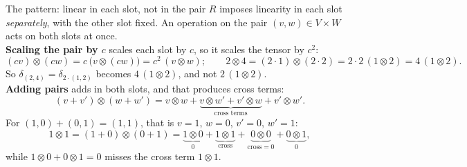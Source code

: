 \documentclass[aspectratio=1610,11pt]{beamer}
\begin{document}
\begin{frame}{The pattern: linear in each slot, not in the pair}
    \small
    $R$ imposes linearity in each slot \emph{separately}, with the other slot fixed. An operation on the pair $(v, w) \in V \times W$ acts on both slots at once.
    \\[0.5em]
    \textbf{Scaling the pair by $c$} scales each slot by $c$, so it scales the tensor by $c^2$:
    \[(cv) \otimes (cw) = c\,\big(v \otimes (cw)\big) = c^2\,(v \otimes w); \qquad 2 \otimes 4 = (2 \cdot 1) \otimes (2 \cdot 2) = 2 \cdot 2\,(1 \otimes 2) = 4\,(1 \otimes 2).\]
    So $\delta_{(2, 4)} = \delta_{2 \cdot (1, 2)}$ becomes $4\,(1 \otimes 2)$, and not $2\,(1 \otimes 2)$.
    \\[0.5em]
    \textbf{Adding pairs} adds in both slots, and that produces cross terms:
    \[(v + v') \otimes (w + w') = v \otimes w + {\underbrace{v \otimes w' + v' \otimes w}_{\text{cross terms}}} + v' \otimes w'.\]
    For $(1, 0) + (0, 1) = (1, 1)$, that is $v = 1$, $w = 0$, $v' = 0$, $w' = 1$:
    \[1 \otimes 1 = (1 + 0) \otimes (0 + 1) = {\underbrace{1 \otimes 0}_{0}} + {\underbrace{1 \otimes 1}_{\text{cross}}} + {\underbrace{0 \otimes 0}_{\text{cross} = 0}} + {\underbrace{0 \otimes 1}_{0}},\]
    while $1 \otimes 0 + 0 \otimes 1 = 0$ misses the cross term $1 \otimes 1$.
\end{frame}
\end{document}
